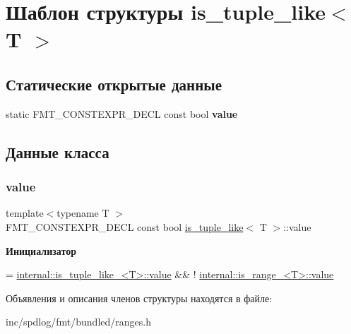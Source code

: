 \hypertarget{structis__tuple__like}{}\section{Шаблон структуры is\+\_\+tuple\+\_\+like$<$ T $>$}
\label{structis__tuple__like}
\subsection*{Статические открытые данные}
\begin{DoxyCompactItemize}
\item 
static F\+M\+T\+\_\+\+C\+O\+N\+S\+T\+E\+X\+P\+R\+\_\+\+D\+E\+CL const bool {\bfseries value}
\end{DoxyCompactItemize}


\subsection{Данные класса}
\mbox{\label{structis__tuple__like_a654492808e520413a641c3f470b7c589}} 
\subsubsection{\texorpdfstring{value}{value}}
{\footnotesize\ttfamily template$<$typename T $>$ \\
F\+M\+T\+\_\+\+C\+O\+N\+S\+T\+E\+X\+P\+R\+\_\+\+D\+E\+CL const bool \hyperlink{structis__tuple__like}{is\+\_\+tuple\+\_\+like}$<$ T $>$\+::value\hspace{0.3cm}{\ttfamily [static]}}

{\bfseries Инициализатор}
\begin{DoxyCode}
=
      \hyperlink{classinternal_1_1is__tuple__like__}{internal::is\_tuple\_like\_<T>::value} && !
      \hyperlink{structinternal_1_1is__range__}{internal::is\_range\_<T>::value}
\end{DoxyCode}


Объявления и описания членов структуры находятся в файле\+:\begin{DoxyCompactItemize}
\item 
inc/spdlog/fmt/bundled/ranges.\+h\end{DoxyCompactItemize}

